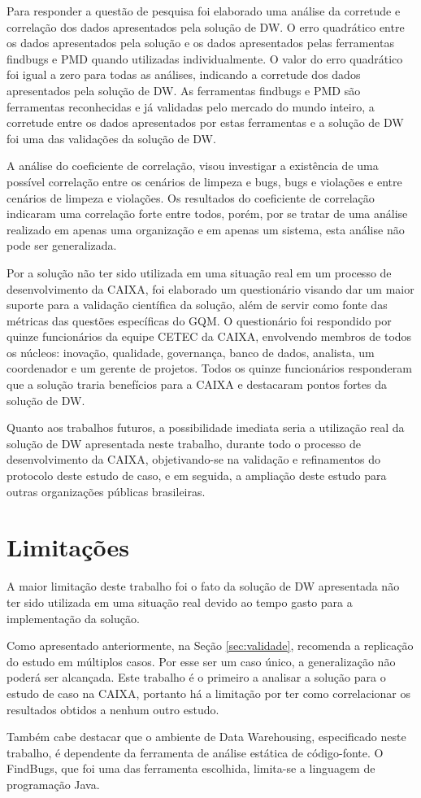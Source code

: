 Para responder a questão de pesquisa foi elaborado uma análise da corretude e correlação dos dados apresentados pela solução de DW. O erro quadrático entre os dados apresentados pela solução e os dados apresentados pelas ferramentas findbugs e PMD quando utilizadas individualmente. O valor do erro quadrático foi igual a zero para todas as análises, indicando a corretude dos dados apresentados pela solução de DW. As ferramentas findbugs e PMD são ferramentas reconhecidas e já validadas pelo mercado do mundo inteiro, a corretude entre os dados apresentados por estas ferramentas e a solução de DW foi uma das validações da solução de DW.

A análise do coeficiente de correlação, visou investigar a existência de uma possível correlação entre os cenários de limpeza e bugs, bugs e violações e entre cenários de limpeza e violações. Os resultados do coeficiente de correlação indicaram uma correlação forte entre todos, porém, por se tratar de uma análise realizado em apenas uma organização e em apenas um sistema, esta análise não pode ser generalizada.

Por a solução não ter sido utilizada em uma situação real em um processo de desenvolvimento da CAIXA, foi elaborado um questionário visando dar um maior suporte para a validação científica da solução, além de servir como fonte das métricas das questões específicas do GQM. O questionário foi respondido por quinze funcionários da equipe CETEC da CAIXA, envolvendo membros de todos os núcleos: inovação, qualidade, governança, banco de dados, analista, um coordenador e um gerente de projetos. Todos os quinze funcionários responderam que a solução traria benefícios para a CAIXA e destacaram pontos fortes da solução de DW.  

Quanto aos trabalhos futuros, a possibilidade imediata seria a utilização real da solução de DW apresentada neste trabalho, durante todo o processo de desenvolvimento da CAIXA, objetivando-se na validação e refinamentos do protocolo deste estudo de caso, e em seguida, a ampliação deste estudo para outras organizações públicas brasileiras.  

\section{Limitações}

A maior limitação deste trabalho foi o fato da solução de DW apresentada não ter sido utilizada em uma situação real devido ao tempo gasto para a implementação da solução. 

Como apresentado anteriormente, na Seção \ref{sec:validade},  recomenda a replicação do estudo em múltiplos casos. Por esse ser um caso único, a generalização não poderá ser alcançada. Este trabalho é o primeiro a analisar a solução para o estudo de caso na CAIXA, portanto há a limitação por ter como correlacionar os resultados obtidos a nenhum outro estudo.

Também cabe destacar que o ambiente de Data Warehousing, especificado neste trabalho, é dependente da ferramenta de análise estática de código-fonte. O FindBugs, que foi uma das ferramenta escolhida, limita-se a linguagem de programação Java.




